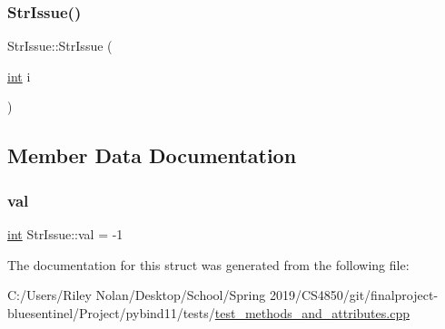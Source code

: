 \mbox{\label{struct_str_issue_a59481c3b766f228c859b6e91bb569c8c}} 
\subsubsection{\texorpdfstring{StrIssue()}{StrIssue()}\hspace{0.1cm}{\footnotesize\ttfamily [2/2]}}
{\footnotesize\ttfamily Str\+Issue\+::\+Str\+Issue (\begin{DoxyParamCaption}\item[{\mbox{\hyperlink{warnings_8h_a74f207b5aa4ba51c3a2ad59b219a423b}{int}}}]{i }\end{DoxyParamCaption})\hspace{0.3cm}{\ttfamily [inline]}}



\subsection{Member Data Documentation}
\mbox{\label{struct_str_issue_ae8d7bda00d07251eb6c45a7f09e9b6e9}} 
\subsubsection{\texorpdfstring{val}{val}}
{\footnotesize\ttfamily \mbox{\hyperlink{warnings_8h_a74f207b5aa4ba51c3a2ad59b219a423b}{int}} Str\+Issue\+::val = -\/1}



The documentation for this struct was generated from the following file\+:\begin{DoxyCompactItemize}
\item 
C\+:/\+Users/\+Riley Nolan/\+Desktop/\+School/\+Spring 2019/\+C\+S4850/git/finalproject-\/bluesentinel/\+Project/pybind11/tests/\mbox{\hyperlink{test__methods__and__attributes_8cpp}{test\+\_\+methods\+\_\+and\+\_\+attributes.\+cpp}}\end{DoxyCompactItemize}
